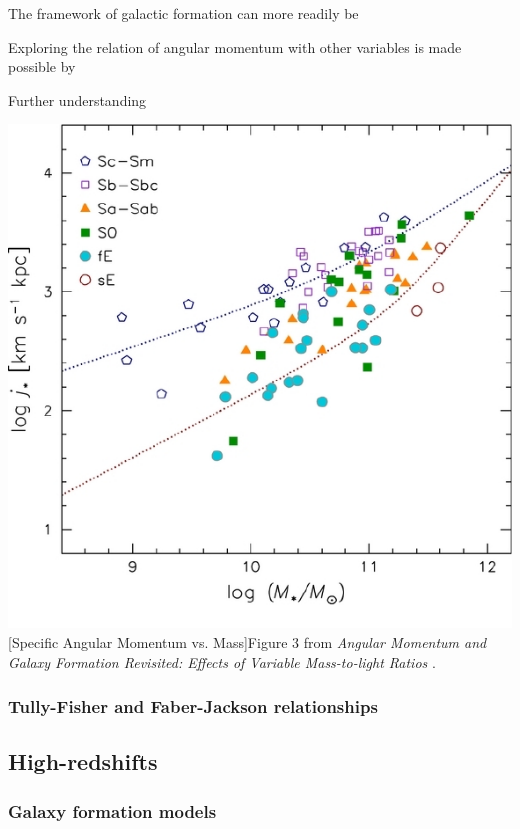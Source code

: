 \documentclass[12pt, twocolumn]{revtex4}    %
\begin{document}
The framework of galactic formation can more readily be 

Exploring the relation of angular momentum with other variables is made possible by 

Further understanding 

\begin{center}
\includegraphics[width=1.0\linewidth]{introduction/romanowsky_2012_fig_3}
[Specific Angular Momentum vs. Mass]{Figure 3 from \textit{Angular Momentum and Galaxy Formation Revisited: Effects of Variable Mass-to-light Ratios} \citep{2012ApJS..203...17R}. }
\label{fig:romanowsky_2012_fig_3}
\end{center} 

\vspace{4ex}
\subsubsection{Tully-Fisher and Faber-Jackson relationships}

\subsection{High-redshifts}

\subsubsection{Galaxy formation models}
\end{document}
